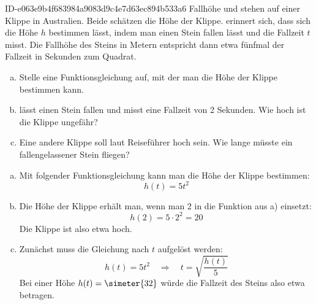 \begin{exercise}
      {ID-e063e9b4f683984a9083d9c4e7d63ec894b533a6}
      {Fallhöhe}
  \ifproblem\problem
    \xya{} und \xyb{} stehen auf einer Klippe in Australien. Beide schätzen
    die Höhe der Klippe. \xya{} erinnert sich, dass sich die Höhe $h$ bestimmen
    lässt, indem man einen Stein fallen lässt und die Fallzeit $t$ misst. Die
    Fallhöhe des Steins in Metern entspricht dann etwa fünfmal der Fallzeit in
    Sekunden zum Quadrat.
    \begin{enumerate}[a)]
      \item Stelle eine Funktionsgleichung auf, mit der man die Höhe der Klippe
            bestimmen kann.
      \item \xya{} lässt einen Stein fallen und \xyb{} misst eine Fallzeit
            von \num{2} Sekunden. Wie hoch ist die Klippe ungefähr?
      \item Eine andere Klippe soll laut Reiseführer  hoch sein.
            Wie lange müsste ein fallengelassener Stein fliegen?
    \end{enumerate}
  \fi
  \ifoutcome\outcome
    \begin{enumerate}[a)]
      \item Mit folgender Funktionsgleichung kann man die Höhe der Klippe
            bestimmen:
            \begin{equation*}
              h(t)=5t^2
            \end{equation*}
      \item Die Höhe der Klippe erhält man, wenn man \num{2} in die Funktion aus a)
            einsetzt:
            \begin{equation*}
              h(\num{2})=5\cdot\num{2}^2=\num{20}
            \end{equation*}
            Die Klippe ist also etwa  hoch.
      \item Zunächst muss die Gleichung nach $t$ aufgelöst werden:
            \begin{equation*}
              h(t)=5t^2\quad\Rightarrow\quad t=\sqrt{\frac{h(t)}{5}}
            \end{equation*}
            Bei einer Höhe $h(t)=\simeter{32}$ würde die Fallzeit
            des Steins also etwa  betragen.
    \end{enumerate}
  \fi
\end{exercise}
